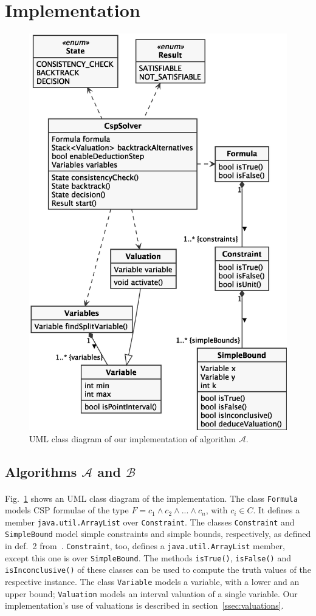 \section{Implementation}

\begin{figure}[H]
    \centering
    \includegraphics[width=.6\textwidth]{images/class-diagram}
    \caption{UML class diagram of our implementation of algorithm $\mathcal{A}$.}
    \label{fig:class-diagram}
\end{figure}


\subsection{Algorithms $\mathcal{A}$ and $\mathcal{B}$}

\paragraph{}
Fig.~\ref{fig:class-diagram} shows an UML class diagram of the implementation.
The class \texttt{Formula} models CSP formulae of the type $F = c_1 \wedge c_2 \wedge ... \wedge c_n$, with $c_i \in C$.
It defines a member \texttt{java.util.ArrayList} over \texttt{Constraint}.
The classes \texttt{Constraint} and \texttt{SimpleBound} model simple constraints and simple bounds, respectively, as defined in def.~2 from~\cite{MF19}.
\texttt{Constraint}, too, defines a \texttt{java.util.ArrayList} member, except this one is over \texttt{SimpleBound}.
The methods \texttt{isTrue()}, \texttt{isFalse()} and \texttt{isInconclusive()} of these classes can be used to compute the truth values of the respective instance.
The class \texttt{Variable} models a variable, with a lower and an upper bound; \texttt{Valuation} models an interval valuation of a single variable.
Our implementation's use of valuations is described in section~\ref{ssec:valuations}.

